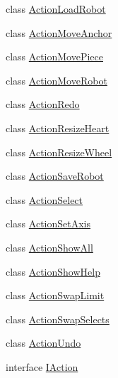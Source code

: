 \begin{DoxyCompactItemize}
\item 
class \hyperlink{classgearit_1_1src_1_1editor_1_1robot_1_1action_1_1_action_load_robot}{Action\+Load\+Robot}
\item 
class \hyperlink{classgearit_1_1src_1_1editor_1_1robot_1_1action_1_1_action_move_anchor}{Action\+Move\+Anchor}
\item 
class \hyperlink{classgearit_1_1src_1_1editor_1_1robot_1_1action_1_1_action_move_piece}{Action\+Move\+Piece}
\item 
class \hyperlink{classgearit_1_1src_1_1editor_1_1robot_1_1action_1_1_action_move_robot}{Action\+Move\+Robot}
\item 
class \hyperlink{classgearit_1_1src_1_1editor_1_1robot_1_1action_1_1_action_redo}{Action\+Redo}
\item 
class \hyperlink{classgearit_1_1src_1_1editor_1_1robot_1_1action_1_1_action_resize_heart}{Action\+Resize\+Heart}
\item 
class \hyperlink{classgearit_1_1src_1_1editor_1_1robot_1_1action_1_1_action_resize_wheel}{Action\+Resize\+Wheel}
\item 
class \hyperlink{classgearit_1_1src_1_1editor_1_1robot_1_1action_1_1_action_save_robot}{Action\+Save\+Robot}
\item 
class \hyperlink{classgearit_1_1src_1_1editor_1_1robot_1_1action_1_1_action_select}{Action\+Select}
\item 
class \hyperlink{classgearit_1_1src_1_1editor_1_1robot_1_1action_1_1_action_set_axis}{Action\+Set\+Axis}
\item 
class \hyperlink{classgearit_1_1src_1_1editor_1_1robot_1_1action_1_1_action_show_all}{Action\+Show\+All}
\item 
class \hyperlink{classgearit_1_1src_1_1editor_1_1robot_1_1action_1_1_action_show_help}{Action\+Show\+Help}
\item 
class \hyperlink{classgearit_1_1src_1_1editor_1_1robot_1_1action_1_1_action_swap_limit}{Action\+Swap\+Limit}
\item 
class \hyperlink{classgearit_1_1src_1_1editor_1_1robot_1_1action_1_1_action_swap_selects}{Action\+Swap\+Selects}
\item 
class \hyperlink{classgearit_1_1src_1_1editor_1_1robot_1_1action_1_1_action_undo}{Action\+Undo}
\item 
interface \hyperlink{interfacegearit_1_1src_1_1editor_1_1robot_1_1action_1_1_i_action}{I\+Action}
\end{DoxyCompactItemize}
